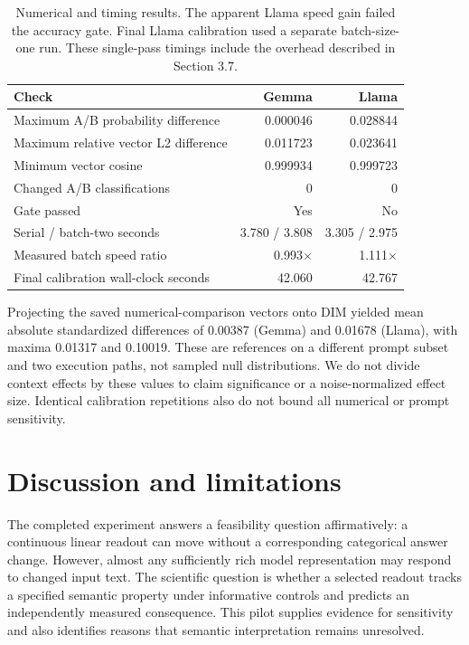 \begin{table}[t]
\caption{Numerical and timing results. The apparent Llama speed gain failed the accuracy gate. Final Llama calibration used a separate batch-size-one run. These single-pass timings include the overhead described in Section 3.7.}
\label{tab:4}
\small
\setlength{\tabcolsep}{4pt}
\begin{tabularx}{\linewidth}{@{}Xrr@{}}
\toprule
\textbf{Check} & \textbf{Gemma} & \textbf{Llama} \\
\midrule
Maximum A/B probability difference & 0.000046 & 0.028844 \\
Maximum relative vector L2 difference & 0.011723 & 0.023641 \\
Minimum vector cosine & 0.999934 & 0.999723 \\
Changed A/B classifications & 0 & 0 \\
Gate passed & Yes & No \\
Serial / batch-two seconds & 3.780 / 3.808 & 3.305 / 2.975 \\
Measured batch speed ratio & 0.993\ensuremath{\times} & 1.111\ensuremath{\times} \\
Final calibration wall-clock seconds & 42.060 & 42.767 \\
\bottomrule
\end{tabularx}
\end{table}

Projecting the saved numerical-comparison vectors onto DIM yielded mean absolute standardized differences of 0.00387 (Gemma) and 0.01678 (Llama), with maxima 0.01317 and 0.10019. These are references on a different prompt subset and two execution paths, not sampled null distributions. We do not divide context effects by these values to claim significance or a noise-normalized effect size. Identical calibration repetitions also do not bound all numerical or prompt sensitivity.

\section{Discussion and limitations}\label{discussion-and-limitations}

The completed experiment answers a feasibility question affirmatively: a continuous linear readout can move without a corresponding categorical answer change. However, almost any sufficiently rich model representation may respond to changed input text. The scientific question is whether a selected readout tracks a specified semantic property under informative controls and predicts an independently measured consequence. This pilot supplies evidence for sensitivity and also identifies reasons that semantic interpretation remains unresolved.

